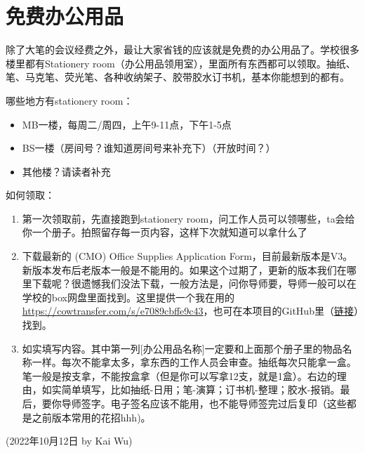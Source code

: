 \section{免费办公用品}
除了大笔的会议经费之外，最让大家省钱的应该就是免费的办公用品了。学校很多楼里都有Stationery room（办公用品领用室），里面所有东西都可以领取。抽纸、笔、马克笔、荧光笔、各种收纳架子、胶带胶水订书机，基本你能想到的都有。

哪些地方有stationery room：
\begin{itemize}
    \item MB一楼，每周二/周四，上午9-11点，下午1-5点
    \item BS一楼（房间号？谁知道房间号来补充下）（开放时间？）
    \item 其他楼？请读者补充
\end{itemize}

如何领取：
\begin{enumerate}
    \item 第一次领取前，先直接跑到stationery room，问工作人员可以领哪些，ta会给你一个册子。拍照留存每一页内容，这样下次就知道可以拿什么了
    \item 下载最新的 (CMO) Office Supplies Application Form，目前最新版本是V3。新版本发布后老版本一般是不能用的。如果这个过期了，更新的版本我们在哪里下载呢？很遗憾我们没法下载，一般方法是，问你导师要，导师一般可以在学校的box网盘里面找到。这里提供一个我在用的\url{https://cowtransfer.com/s/e7089cbffe9c43}，也可在本项目的GitHub里（\href{https://github.com/kaiwu-astro/xp_pgrs_unofficial_guide/tree/main/fileshare}{链接}）找到。
    \item 如实填写内容。其中第一列[办公用品名称]一定要和上面那个册子里的物品名称一样。每次不能拿太多，拿东西的工作人员会审查。抽纸每次只能拿一盒。笔一般是按支拿，不能按盒拿（但是你可以写拿12支，就是1盒）。右边的理由，如实简单填写，比如抽纸-日用；笔-演算；订书机-整理；胶水-报销。最后，要你导师签字。电子签名应该不能用，也不能导师签完过后复印（这些都是之前版本常用的花招hhh)。
\end{enumerate}


\begin{flushright}
(2022年10月12日 by Kai Wu)
\end{flushright}